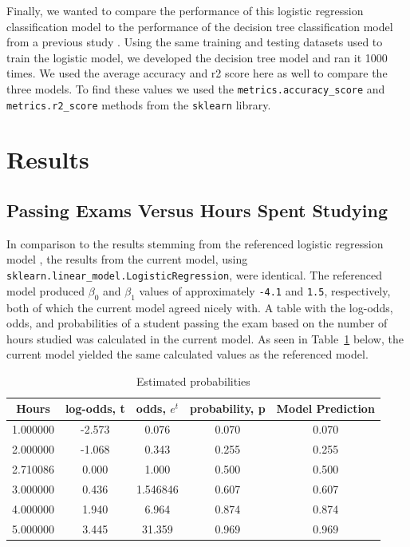 \documentclass[journal]{IEEEtran}
\begin{document}
Finally, we wanted to compare the performance of this logistic regression classification model to the performance of the decision tree classification model from a previous study \cite{b5}. Using the same training and testing datasets used to train the logistic model, we developed the decision tree model and ran it 1000 times. We used the average accuracy and r2 score here as well to compare the three models. To find these values we used the \lstinline{metrics.accuracy_score} and \lstinline{metrics.r2_score} methods from the \lstinline{sklearn} library. 

\section{Results}

\subsection{Passing Exams Versus Hours Spent Studying}

In comparison to the results stemming from the referenced logistic regression model \cite{b3}, the results from the current model, using \lstinline{sklearn.linear_model.LogisticRegression}, were identical. The referenced model produced $\beta_0$ and $\beta_1$ values of approximately \lstinline{-4.1} and \lstinline{1.5}, respectively, both of which the current model agreed nicely with. A table with the log-odds, odds, and probabilities of a student passing the exam based on the number of hours studied was calculated in the current model. As seen in Table~\ref{table:log-odds-table} below, the current model yielded the same calculated values as the referenced model.

\begin{table}[h!]
\centering
\begin{tabular}{ c c c c c }
    Hours &	log-odds, t &	odds, \(e^t\) &	probability, p &	Model Prediction \\ 
\hline
1.000000 &	-2.573 &	0.076 &	0.070 &	0.070 \\
2.000000 &	-1.068 &	0.343 &	0.255 &	0.255 \\
2.710086 &	0.000 &	1.000 &	0.500 &	0.500 \\
3.000000 &	0.436 &	1.546846 &	0.607 &	0.607 \\
4.000000 &	1.940 &	6.964 &	0.874 &	0.874 \\
5.000000 &	3.445 &	31.359 &	0.969 &	0.969
\end{tabular}
\caption{Estimated probabilities}
\label{table:log-odds-table}
\end{table}
\end{document}
